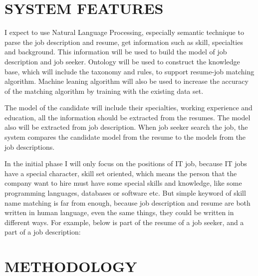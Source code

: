 \section{SYSTEM FEATURES}

I expect to use Natural Language Processing, especially semantic technique to parse the job description and resume, get information such as skill, specialties and background. This information will be used to build the model of job description and job seeker.  Ontology will be used to construct the knowledge base, which will include the taxonomy and rules, to support resume-job matching algorithm. Machine leaning algorithm will also be used to increase the accuracy of the matching algorithm by training with the existing data set.

The model of the candidate will include their specialties, working experience and education, all the information should be extracted from the resumes. The model also will be extracted from job description. When job seeker search the job, the system compares the candidate model from the resume to the models from the job descriptions.

In the initial phase I will only focus on the positions of IT job, because IT jobs have a special character,  skill set oriented, which means the person that the company want to hire must have some special skills and knowledge, like some programming languages, databases or software etc.
But simple keyword of skill name matching is far from enough, because job description and resume are both written in human language, even the same things, they could be written in different ways. For example, below is part of the resume of a job seeker, and a part of a job description:



\section{METHODOLOGY}



